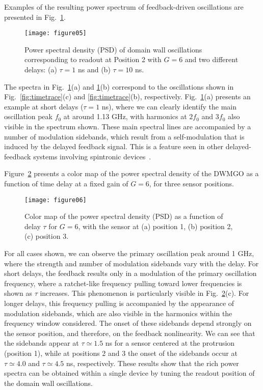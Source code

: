\documentclass[aip,reprint,amsmath,amssymb,floatfix,superscriptaddress]{revtex4-1}
\begin{document}
Examples of the resulting power spectrum of feedback-driven oscillations are presented in Fig.~\ref{fig:psd}.
%
\begin{figure}
\centering\texttt{[image: figure05]}
\caption{Power spectral density (PSD) of domain wall oscillations corresponding to readout at Position 2 with $G=6$ and two different delays: (a) $\tau = 1$ ns and (b) $\tau = 10$ ns.}
\label{fig:psd}
\end{figure}
%
The spectra in Fig.~\ref{fig:psd}(a) and \ref{fig:psd}(b) correspond to the oscillations shown in Fig.~\ref{fig:timetrace}(c) and \ref{fig:timetrace}(b), respectively. Fig.~\ref{fig:psd}(a) presents an example at short delays ($\tau = 1$ ns), where we can clearly identify the main oscillation peak $f_0$ at around 1.13 GHz, with harmonics at $2f_0$ and $3f_0$ also visible in the spectrum shown. These main spectral lines are accompanied by a number of modulation sidebands, which result from a self-modulation that is induced by the delayed feedback signal. This is a feature seen in other delayed-feedback systems involving spintronic devices~\cite{Singh:2017gt, Singh:2018gr, williame:2020eo}.



Figure~\ref{fig:psdtau} presents a color map of the power spectral density of the DWMGO as a function of time delay at a fixed gain of $G=6$, for three sensor positions.
%
\begin{figure}
\centering\texttt{[image: figure06]}
\caption{Color map of the power spectral density (PSD) as a function of delay $\tau$ for $G = 6$, with the sensor at (a) position 1, (b) position 2, (c) position 3.}
\label{fig:psdtau}
\end{figure}
%
For all cases shown, we can observe the primary oscillation peak around 1 GHz, where the strength and number of modulation sidebands vary with the delay. For short delays, the feedback results only in a modulation of the primary oscillation frequency, where a ratchet-like frequency pulling toward lower frequencies is shown as $\tau$ increases. This phenomenon is particularly visible in Fig.~\ref{fig:psdtau}(c). For longer delays, this frequency pulling is accompanied by the appearance of modulation sidebands, which are also visible in the harmonics within the frequency window considered. The onset of these sidebands depend strongly on the sensor position, and therefore, on the feedback nonlinearity. We can see that the sidebands appear at $\tau \simeq 1.5$ ns for a sensor centered at the protrusion (position 1), while at positions 2 and 3 the onset of the sidebands occur at $\tau \simeq 4.0$ and $\tau \simeq 4.5$ ns, respectively. These results show that the rich power spectra can be obtained within a single device by tuning the readout position of the domain wall oscillations.
\end{document}
